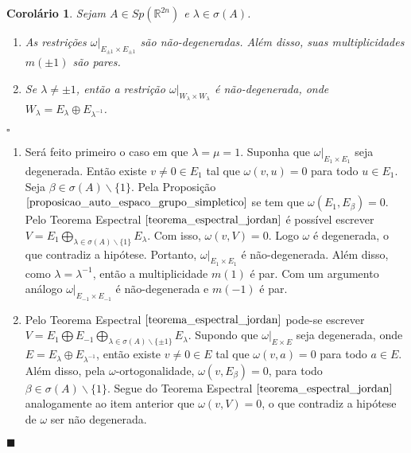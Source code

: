 \documentclass[12pt]{book}
\newtheorem{corolario}[teorema]{Corolário}
\newenvironment{prova}[1]{$\square$ #1}{\hfill$\blacksquare$}
\newcommand{\complementar}[2]{#1 \backslash #2}
\newcommand{\formaSimpletica}[2]{\omega(#1, #2)}
\newcommand{\gruposimpletico}[1]{Sp(#1)}
\newcommand{\real}[1]{\mathbb{R}^{#1}}
\begin{document}
	\begin{corolario}\label{corolario_restricao_forma_simpletica}
		Sejam $A \in \gruposimpletico{\real{2n}}$ e $\lambda \in \sigma(A)$. 
		\begin{enumerate}
			\item As restrições $\omega|_{E_{\pm 1} \times E_{\pm 1}}$ são não-degeneradas. Além disso, suas multiplicidades $m(\pm 1)$ são pares.
			
			\item Se $\lambda \neq \pm 1$, então a restrição $\omega|_{W_{\lambda} \times W_{\lambda}}$ é não-degenerada, onde $W_{\lambda } = E_{\lambda} \oplus E_{\lambda^{-1}}$.
		\end{enumerate}
	\end{corolario}
	\begin{prova}
		\begin{enumerate}
			\item  Será feito primeiro o caso em que $\lambda = \mu =1$. Suponha que $\omega|_{E_{1}\times E_{1}}$ seja degenerada. Então existe $v\neq 0 \in E_{1}$ tal que $\omega(v, u) = 0$ para todo $u \in E_{1}$. Seja $\beta \in \complementar{\sigma(A)}{\{1 \}}$. Pela Proposição $\ref{proposicao_auto_espaco_grupo_simpletico}$ se tem que $\formaSimpletica{E_{1}}{E_{\beta}} = 0$. Pelo Teorema Espectral $\ref{teorema_espectral_jordan}$ é possível escrever $V = E_{1}  \bigoplus_{\lambda \in \complementar{\sigma(A)}{ \{1\}  }}E_{\lambda}$. Com isso, $\formaSimpletica{v}{V} = 0$. Logo $\omega$ é degenerada, o que contradiz a hipótese. Portanto, $\omega|_{E_{1} \times E_{1}}$ é não-degenerada. Além disso, como $\lambda = \lambda^{-1}$, então a multiplicidade $m(1)$ é par. Com um argumento análogo $\omega|_{E_{-1} \times E_{-1}}$ é não-degenerada e $m(-1)$ é par. 
			
			\item Pelo Teorema Espectral $\ref{teorema_espectral_jordan}$ pode-se escrever $V = E_{1}  \bigoplus E_{-1}  \bigoplus_{\lambda \in \complementar{\sigma(A)}{ \{\pm 1\}  }}E_{\lambda}$. Supondo que $\omega|_{E\times E}$ seja degenerada, onde $E= E_{\lambda} \oplus E_{\lambda^{-1}}$, então existe $v \neq 0 \in E$ tal que 
			$\omega(v,a)=0$ para todo $a\in E$. Além disso, pela $\omega$-ortogonalidade,  $\omega(v,E_{\beta})=0$, para todo $\beta\in \complementar{\sigma(A)}{\{1\} }$. Segue do Teorema Espectral $\ref{teorema_espectral_jordan}$ analogamente ao item anterior que $\omega(v,V)=0$, o que contradiz a hipótese de $\omega$ ser não degenerada.
		\end{enumerate}
	\end{prova}
	
\end{document}
